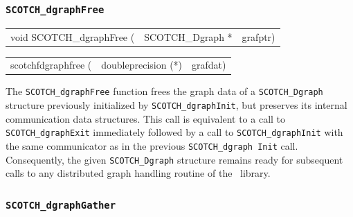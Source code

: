 \subsubsection{{\tt SCOTCH\_dgraphFree}}

\begin{itemize}
\progsyn

{\tt\begin{tabular}{l@{}ll}
void SCOTCH\_dgraphFree ( & SCOTCH\_Dgraph * & grafptr)
\end{tabular}}

{\tt\begin{tabular}{l@{}ll}
scotchfdgraphfree ( & doubleprecision (*) & grafdat)
\end{tabular}}

\progdes

The {\tt SCOTCH\_dgraphFree} function frees the graph data of a
{\tt SCOTCH\_\lbt Dgraph} structure previously initialized by
{\tt SCOTCH\_\lbt dgraph\lbt Init}, but preserves its internal
communication data structures. This call is equivalent to
a call to {\tt SCOTCH\_\lbt dgraph\lbt Exit} immediately
followed by a call to {\tt SCOTCH\_\lbt dgraph\lbt Init} with the
same communicator as in the previous {\tt SCOTCH\_\lbt dgraph\lbt
Init} call. Consequently, the given {\tt SCOTCH\_\lbt Dgraph}
structure remains ready for subsequent calls to any distributed
graph handling routine of the \libscotch\ library.
\end{itemize}

\subsubsection{{\tt SCOTCH\_dgraphGather}}

